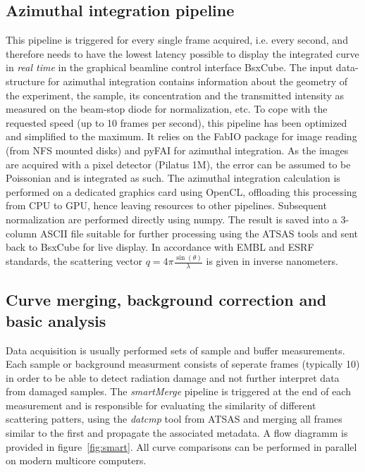 \documentclass[preprint,pdf]{iucr}              %
\begin{document}
\subsection{Azimuthal integration pipeline}

This pipeline is triggered for every single frame acquired, i.e. every second,
and therefore needs to have the lowest latency possible to display the integrated curve
in \textit{real time} in the graphical beamline control  interface BsxCube.
The input data-structure for azimuthal integration contains 
information about the geometry of the experiment, the sample, its concentration
and the transmitted intensity as measured on the beam-stop diode for
normalization, etc.
To cope with the requested speed (up to 10 frames per second), this pipeline
has been optimized and simplified to the maximum. 
It relies on the FabIO\cite{fabio} package for image reading (from NFS mounted disks) and
pyFAI\cite{pyFAI} for azimuthal integration. 
As the images are acquired with a pixel detector (Pilatus 1M), the error can be
assumed to be Poissonian and is integrated as such. 
The azimuthal integration calculation is performed on a dedicated graphics card using OpenCL, offloading this processing from CPU to
GPU, hence leaving resources to other pipelines.  Subsequent normalization are performed directly using numpy\cite{numpy}.
The result is saved into a 3-column ASCII file suitable for further processing
using the ATSAS tools\cite{atsas} and sent back to BsxCube for live display. In accordance with EMBL and ESRF standards, the scattering vector $q=4\pi\frac{\sin(\theta)}{\lambda}$ is given in inverse nanometers.

\subsection{Curve merging, background correction and basic analysis}
Data acquisition is usually performed sets of sample and buffer measurements. Each sample or background measurment consists of seperate frames (typically 10) 
in order to be able to detect radiation damage and not further interpret data from damaged samples.
The \textit{smartMerge} pipeline is triggered at the end of each measurement
and is responsible for evaluating the similarity of different scattering
patters, using the \textit{datcmp} tool from ATSAS and merging all frames
similar to the first and propagate the associated metadata. A flow diagramm is provided in figure~\ref{fig:smart}. All curve comparisons
can be performed in parallel on modern multicore computers.\\
\end{document}
